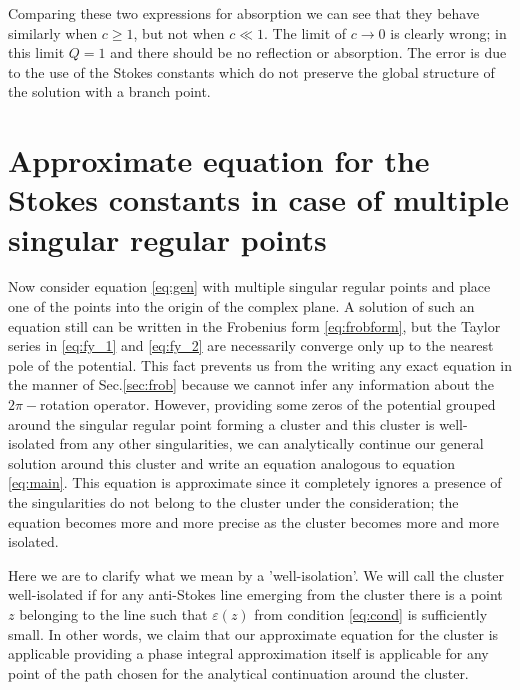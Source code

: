 \documentclass[aip,jmp,reprint]{revtex4-1}
\begin{document}
Comparing these two expressions for absorption we can see that they behave similarly when $c \geq 1$, 
but not when $c \ll 1$. The limit of $c\rightarrow 0$ is clearly wrong; in this limit $Q=1$
and there should be no reflection or absorption. The error is due to the use of the Stokes constants 
which do not preserve the global structure of the solution with a branch point. 

\section{Approximate equation for the Stokes constants in case of multiple singular regular points \label{sec:approx}}

Now consider equation \eqref{eq:gen} with multiple singular regular points and place one of the points
into the origin of the complex plane. A solution of such an equation still can be written in
the Frobenius form \eqref{eq:frobform}, but the Taylor series in \eqref{eq:fy_1} and \eqref{eq:fy_2}
are necessarily converge only up to the nearest pole of the potential\cite{cbbook}. This fact
prevents us from the writing any exact equation in the manner of Sec.\ref{sec:frob} because
we cannot infer any information about the $2\pi-$rotation operator. However, providing some
zeros of the potential grouped around the singular regular point forming a cluster and this cluster is
well-isolated from any other singularities, we can analytically continue our general solution
around this cluster and write an equation analogous to equation \eqref{eq:main}. This equation
is approximate since it completely ignores a presence of the singularities do not belong to
the cluster under the consideration; the equation becomes more and more precise as the cluster
becomes more and more isolated. 

Here we are to clarify what we mean by a 'well-isolation'. We will call the cluster
well-isolated if for any anti-Stokes line emerging from the cluster there is a point $z$ belonging 
to the line such that $\varepsilon(z)$ from condition \eqref{eq:cond} is sufficiently small. In other words,
we claim that our approximate equation for the cluster is applicable providing a phase integral
approximation itself is applicable for any point of the path chosen for the analytical continuation 
around the cluster.
 
\end{document}
